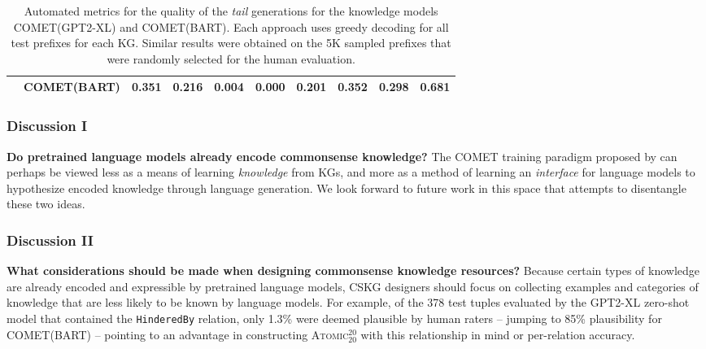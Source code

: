 \documentclass[10pt,aspectratio=43]{beamer}
\newcommand\atomicTT{\textsc{Atomic$^{20}_{20}$}\xspace}
\newcommand\gptxl{\textsc{GPT2-XL}\xspace}
\newcommand\cometgptxl{\textsc{COMET(GPT2-XL)}\xspace}
\newcommand\cometbart{\textsc{COMET(BART)}\xspace}
\newcommand\HinderedBy{\texttt{HinderedBy}}
\begin{document}
\begin{frame}
\begin{table}[t]
{\begin{tabular}{llcccccccc}
                 & \cometbart{}         &    \bf  0.351 &   \bf  0.216 &   \bf  0.004 &    0.000 &  \bf   0.201 &   \bf   0.352 & \bf   0.298 &      \bf   0.681 \\
                 \bottomrule
            \end{tabular}}
            \caption{Automated metrics for the quality of the \emph{tail} generations for the knowledge models \cometgptxl{} and \cometbart{}. Each approach uses greedy decoding for all test prefixes for each KG. Similar results were obtained on the 5K sampled prefixes that were randomly selected for the human evaluation.}
            \label{tab:auto-eval-full-test}
        \end{table}
    \end{frame}
    
    \begin{frame}
        \frametitle{\textbf{Discussion I}}
        \begin{block}{\textbf{Do pretrained language models already encode commonsense knowledge?}}
            The COMET training paradigm proposed by can perhaps be viewed less as a means of learning \textit{knowledge} from KGs, and more as a method of learning an \textit{interface} for language models to hypothesize encoded knowledge through language generation. We look forward to future work in this space that attempts to disentangle these two ideas.
        \end{block}
    \end{frame}
    
    \begin{frame}
        \frametitle{\textbf{Discussion II}}
        \begin{block}{\textbf{What considerations should be made when designing commonsense knowledge resources?}}
            Because certain types of knowledge are already encoded and expressible by pretrained language models, CSKG designers should focus on collecting examples and categories of knowledge that are less likely to be known by language models. For example, of the 378 test tuples evaluated by the \gptxl{} zero-shot model that contained the \HinderedBy{} relation, only 1.3\% were deemed plausible by human raters -- jumping to 85\% plausibility for \cometbart{} -- pointing to an advantage in constructing \atomicTT{} with this relationship in mind or per-relation accuracy.
        \end{block}
    \end{frame}
\end{document}
